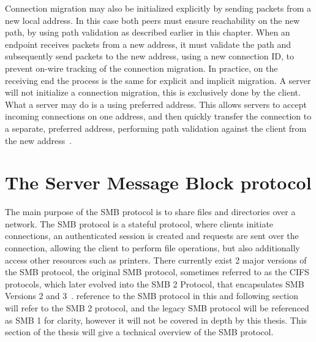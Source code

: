 \documentclass[english, 12pt, a4paper, elec, utf8, a-2b, online]{aaltothesis}
\begin{document}
Connection migration may also be initialized explicitly by sending packets from
a new local address. In this case both peers must ensure reachability on the
new path, by using path validation as described earlier in this chapter. When an endpoint
receives packets from a new address, it must validate the path and subsequently
send packets to the new address, using a new connection ID, to prevent on-wire
tracking of the connection migration. In practice, on the receiving end the process
is the same for explicit and implicit migration. A server will not initialize a 
connection migration, this is exclusively done by the client. What a server may
do is a using preferred address. This allows servers to accept incoming connections
on one address, and then quickly transfer the connection to a separate, preferred
address, performing path validation against the client from the new address~\cite{rfc9000}.

\clearpage

\section{The Server Message Block protocol}
\label{sec:smb}

The main purpose of the SMB protocol is to share files and directories over a network.
The SMB protocol is a stateful protocol, where clients initiate connections,
an authenticated session is created and requests are sent over the connection, allowing
the client to perform file operations, but also additionally access other resources
such as printers. There currently exist 2 major versions of the SMB protocol,
the original SMB protocol, sometimes referred to as the CIFS protocols, which later
evolved into the SMB 2 Protocol, that encapsulates SMB Versions 2 and 3~\cite{smb2_tech}. reference
to the SMB protocol in this and following section will refer to the SMB 2 protocol,
and the legacy SMB protocol will be referenced as SMB 1 for clarity, however it will
not be covered in depth by this thesis. This section of the thesis will give a
technical overview of the SMB protocol.
\end{document}
